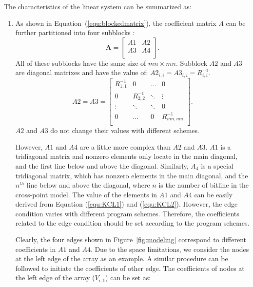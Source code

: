 The characteristics of the linear system can be summarized as:
\begin{enumerate}
  \item As shown in Equation~(\ref{equ:blockedmatrix}), the
      coefficient matrix $A$ can be further partitioned into four
      subblocks :
    \begin{equation}\label{equ:blockedmatrix}
        \mathbf{A} = \left[
        \begin{array}{cc}
            A1 & A2  \\
            A3 & A4  \\
        \end{array} \right].
    \end{equation}
All of these subblocks have the same size of $mn\times mn$. Subblock
$A2$ and $A3$ are diagonal matrixes and have the value of: $A2_{i,i} =
A3_{i,i} = R_{i,i}^{-1}$.
\begin{equation}\label{equ:A2A3}
        A2 = A3 = \left[
        \begin{array}{cccc}
            R_{1,1}^{-1}    & 0             & \ldots    & 0 \\
            0               & R_{2,2}^{-1}  & \ddots    & \vdots  \\
            \vdots          & \ddots        & \ddots    & 0 \\
            0               & \ldots        & 0         & R_{mn,mn}^{-1} \\
        \end{array} \right].
    \end{equation}
$A2$ and $A3$ do not change their values with different schemes.

However, $A1$ and $A4$ are a little more complex than $A2$ and $A3$.
$A1$ is a tridiagonal matrix and nonzero elements only locate in the
main diagonal, and the first line below and above the diagonal.
Similarly, $A_4$ is a special tridiagonal matrix, which has nonzero
elements in the main diagonal, and the $n^{th}$ line below and above
the diagonal, where $n$ is the number of bitline in the cross-point
model. The value of the elements in $A1$ and $A4$ can be easily
derived from Equation (\ref{equ:KCL1}) and (\ref{equ:KCL2}). However,
the edge condition varies with different program schemes. Therefore,
the coefficients related to the edge condition should be set according
to the program schemes.


Clearly, the four edges shown in Figure~\ref{fig:modeling} correspond
to different coefficients in $A1$ and $A4$. Due to the space
limitations, we consider the nodes at the left edge of the array as an
example. A similar procedure can be followed to initiate the
coefficients of other edge. The coefficients of nodes at the left edge
of the array ($V_{i,1}$) can be set as:


\end{enumerate}

